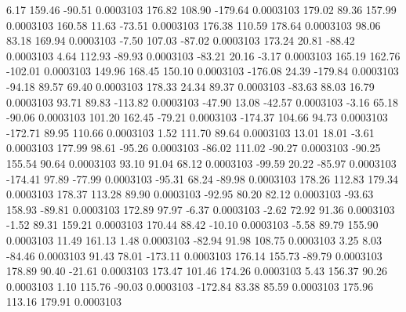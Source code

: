         6.17      159.46      -90.51     0.0003103
      176.82      108.90     -179.64     0.0003103
      179.02       89.36      157.99     0.0003103
      160.58       11.63      -73.51     0.0003103
      176.38      110.59      178.64     0.0003103
       98.06       83.18      169.94     0.0003103
       -7.50      107.03      -87.02     0.0003103
      173.24       20.81      -88.42     0.0003103
        4.64      112.93      -89.93     0.0003103
      -83.21       20.16       -3.17     0.0003103
      165.19      162.76     -102.01     0.0003103
      149.96      168.45      150.10     0.0003103
     -176.08       24.39     -179.84     0.0003103
      -94.18       89.57       69.40     0.0003103
      178.33       24.34       89.37     0.0003103
      -83.63       88.03       16.79     0.0003103
       93.71       89.83     -113.82     0.0003103
      -47.90       13.08      -42.57     0.0003103
       -3.16       65.18      -90.06     0.0003103
      101.20      162.45      -79.21     0.0003103
     -174.37      104.66       94.73     0.0003103
     -172.71       89.95      110.66     0.0003103
        1.52      111.70       89.64     0.0003103
       13.01       18.01       -3.61     0.0003103
      177.99       98.61      -95.26     0.0003103
      -86.02      111.02      -90.27     0.0003103
      -90.25      155.54       90.64     0.0003103
       93.10       91.04       68.12     0.0003103
      -99.59       20.22      -85.97     0.0003103
     -174.41       97.89      -77.99     0.0003103
      -95.31       68.24      -89.98     0.0003103
      178.26      112.83      179.34     0.0003103
      178.37      113.28       89.90     0.0003103
      -92.95       80.20       82.12     0.0003103
      -93.63      158.93      -89.81     0.0003103
      172.89       97.97       -6.37     0.0003103
       -2.62       72.92       91.36     0.0003103
       -1.52       89.31      159.21     0.0003103
      170.44       88.42      -10.10     0.0003103
       -5.58       89.79      155.90     0.0003103
       11.49      161.13        1.48     0.0003103
      -82.94       91.98      108.75     0.0003103
        3.25        8.03      -84.46     0.0003103
       91.43       78.01     -173.11     0.0003103
      176.14      155.73      -89.79     0.0003103
      178.89       90.40      -21.61     0.0003103
      173.47      101.46      174.26     0.0003103
        5.43      156.37       90.26     0.0003103
        1.10      115.76      -90.03     0.0003103
     -172.84       83.38       85.59     0.0003103
      175.96      113.16      179.91     0.0003103
